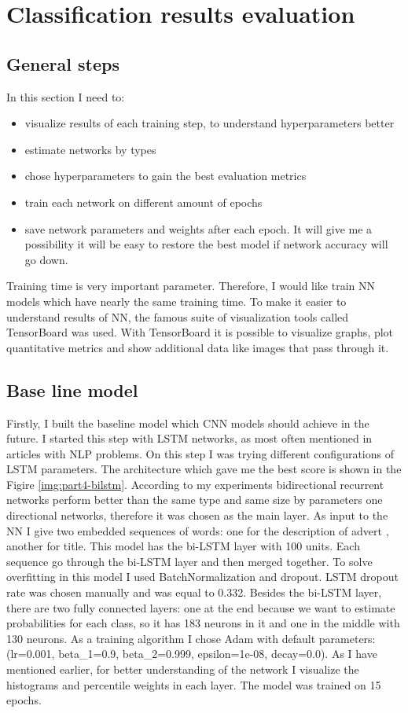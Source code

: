 \chapter{Classification results evaluation} \label{chapt4}

\section{General steps} \label{sect4_1}
\noindent
In this section I need to:
\begin{itemize}
	\item visualize results of each training step, to understand hyperparameters better
	\item estimate networks by types 
	\item chose hyperparameters to gain the best evaluation metrics  
	\item train each network on different amount of epochs
	\item save network parameters and weights after each epoch. It will give me a possibility it will be easy to restore the best model if network accuracy will go down.
\end{itemize}

\noindent
Training time is very important parameter. Therefore, I would like train NN models which have nearly the same training time. To make it easier to understand results of NN, the famous suite of visualization tools called TensorBoard was used. With TensorBoard it is possible to visualize graphs, plot quantitative metrics and show additional data like images that pass through it.  


\section{Base line model} \label{sect4_2}

Firstly, I built the baseline model which CNN models should achieve in the future. I started this step with LSTM networks, as most often mentioned in articles with NLP problems. On this step I was trying different configurations of LSTM parameters. The architecture which gave me the best score is shown in the Figire \ref{img:part4-bilstm}. According to my experiments bidirectional recurrent networks perform better than the same type and same size by parameters one directional networks, therefore it was chosen as the main layer. As input to the NN I give two embedded sequences of words: one for the description of advert , another for title. This model has the bi-LSTM layer with 100 units. Each sequence go through the bi-LSTM layer and then merged together. To solve overfitting in this model I used BatchNormalization and dropout. LSTM dropout rate was chosen manually and was equal to 0.332. Besides the bi-LSTM layer, there are two fully connected layers: one at the end because we want to estimate probabilities for each class, so it has 183 neurons in it and one in the middle with 130 neurons. As a training algorithm I chose Adam with default parameters: (lr=0.001, beta\_1=0.9, beta\_2=0.999, epsilon=1e-08, decay=0.0). As I have mentioned earlier, for better understanding of the network I visualize the histograms and percentile weights in each layer. The model was trained on 15 epochs.


